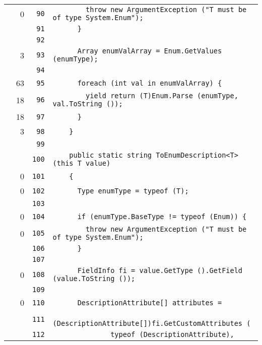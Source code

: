\documentclass[a4paper,10pt]{article}
\begin{document}
\begin{longtable}[l]{lrrl}
\cellcolor{red} & 0 & \verb~90~ & \verb~        throw new ArgumentException ("T must be of type System.Enum");~\\
\cellcolor{gray} &  & \verb~91~ & \verb~      }~\\
\cellcolor{gray} &  & \verb~92~ & \verb~~\\
\cellcolor{green} & 3 & \verb~93~ & \verb~      Array enumValArray = Enum.GetValues (enumType);~\\
\cellcolor{gray} &  & \verb~94~ & \verb~~\\
\cellcolor{green} & 63 & \verb~95~ & \verb~      foreach (int val in enumValArray) {~\\
\cellcolor{green} & 18 & \verb~96~ & \verb~        yield return (T)Enum.Parse (enumType, val.ToString ());~\\
\cellcolor{green} & 18 & \verb~97~ & \verb~      }~\\
\cellcolor{green} & 3 & \verb~98~ & \verb~    }~\\
\cellcolor{gray} &  & \verb~99~ & \verb~~\\
\cellcolor{gray} &  & \verb~100~ & \verb~    public static string ToEnumDescription<T> (this T value)~\\
\cellcolor{red} & 0 & \verb~101~ & \verb~    {~\\
\cellcolor{red} & 0 & \verb~102~ & \verb~      Type enumType = typeof (T);~\\
\cellcolor{gray} &  & \verb~103~ & \verb~~\\
\cellcolor{red} & 0 & \verb~104~ & \verb~      if (enumType.BaseType != typeof (Enum)) {~\\
\cellcolor{red} & 0 & \verb~105~ & \verb~        throw new ArgumentException ("T must be of type System.Enum");~\\
\cellcolor{gray} &  & \verb~106~ & \verb~      }~\\
\cellcolor{gray} &  & \verb~107~ & \verb~~\\
\cellcolor{red} & 0 & \verb~108~ & \verb~      FieldInfo fi = value.GetType ().GetField (value.ToString ());~\\
\cellcolor{gray} &  & \verb~109~ & \verb~~\\
\cellcolor{red} & 0 & \verb~110~ & \verb~      DescriptionAttribute[] attributes =~\\
\cellcolor{gray} &  & \verb~111~ & \verb~          (DescriptionAttribute[])fi.GetCustomAttributes (~\\
\cellcolor{gray} &  & \verb~112~ & \verb~              typeof (DescriptionAttribute),~\\

\end{longtable}
\end{document}

